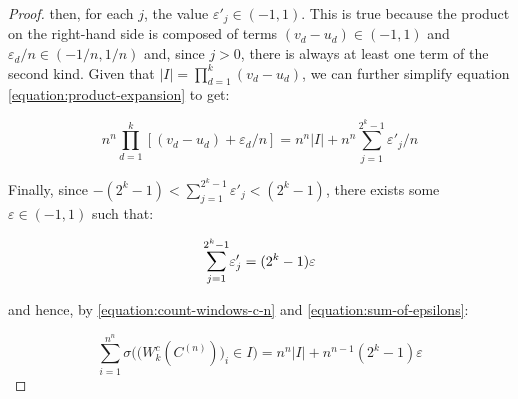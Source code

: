 \documentclass[11pt,a4paper]{tesis}
\theoremstyle{plain}
\theoremstyle{definition}
\begin{document}
\begin{proof}
  then, for each $j$, the value $\varepsilon'_j \in (-1, 1)$. This is true because the product on the right-hand side is composed of terms $(v_d - u_d) \in (-1, 1)$ and $\varepsilon_d / n \in (-1/n, 1/n)$ and, since $j > 0$, there is always at least one term of the second kind. Given that $|I| = \prod_{d = 1}^{k} (v_d - u_d)$, we can further simplify equation \ref{equation:product-expansion} to get:

  \begin{equation}\label{equation:sum-of-epsilons}
    n^n \prod_{d = 1}^{k} [(v_d - u_d) + \varepsilon_d / n] = n^n |I| + n^n \sum_{j = 1}^{2^k - 1} \varepsilon'_j / n
  \end{equation}

  Finally, since $- (2^k - 1) < \sum_{j = 1}^{2^k - 1} \varepsilon'_j < (2^k - 1)$, there exists some $\varepsilon \in (-1, 1)$ such that:

  \begin{equation*}
    \mathlarger{\sum}_{j = 1}^{2^k - 1} \varepsilon'_j = (2^k - 1) \varepsilon
  \end{equation*}

  and hence, by \ref{equation:count-windows-c-n} and \ref{equation:sum-of-epsilons}:

  \begin{equation*}
    \sum_{i = 1}^{n^n} \sigma\Big( \big( W_k^{c}(C^{(n)}) \big)_i \in I \Big) = n^n |I| + n^{n - 1} (2^k - 1) \varepsilon
  \end{equation*}
\end{proof}
\end{document}
